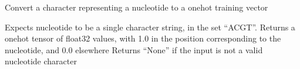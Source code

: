 \documentclass[letterpaper,10pt,english]{sphinxmanual}
\begin{document}

\begin{fulllineitems}
\label{\detokenize{api:lib.dataloader.trainloader.nucleotideToOneHot}}
\pysigstartsignatures
\pysiglinewithargsret
{}
{}
{}
\pysigstopsignatures
\sphinxAtStartPar
Convert a character representing a nucleotide to a one\sphinxhyphen{}hot training vector

\sphinxAtStartPar
Expects nucleotide to be a single character string, in the set “ACGT”.
Returns a one\sphinxhyphen{}hot tensor of float32 values, with 1.0 in the position corresponding to the nucleotide, and 0.0 elsewhere
Returns “None” if the input is not a valid nucleotide character

\end{fulllineitems}



\renewcommand{\indexname}{Python Module Index}
\begin{sphinxtheindex}
\let\bigletter\sphinxstyleindexlettergroup
\bigletter{l}
\item\relax{}
\end{sphinxtheindex}

\renewcommand{\indexname}{Index}
\printindex
\end{document}
